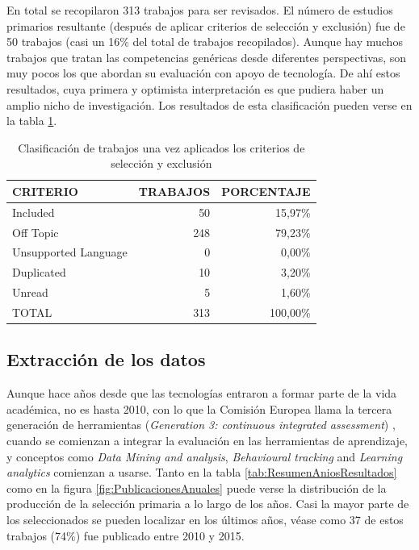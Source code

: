 En total se recopilaron 313 trabajos para ser revisados. El número de estudios primarios resultante (después de aplicar criterios de selección y exclusión) fue de 50 trabajos (casi un 16\% del total de trabajos recopilados). Aunque hay muchos trabajos que tratan las competencias genéricas desde diferentes perspectivas, son muy pocos los que abordan su evaluación con apoyo de tecnología. De ahí estos resultados, cuya primera y optimista interpretación es que pudiera haber un amplio nicho de investigación. Los resultados de esta clasificación pueden verse en la tabla \ref{tab:ResumenSelecccionResultados}.

\begin{table}
  \begin{center}
  \begin{tabular}{| m{4cm} | r | r |}
    \hline
    CRITERIO & TRABAJOS & PORCENTAJE\\
    \hline
    \hline 
    Included & 50 & 15,97\% \\
    \hline
    Off Topic & 248 & 79,23\% \\
    \hline
    Unsupported Language & 0 & 0,00\% \\
    \hline
    Duplicated & 10 & 3,20\% \\
    \hline
    Unread & 5 & 1,60\% \\
    \hline
    TOTAL & 313 & 100,00\% \\
    \hline
  \end{tabular}
\end{center}
\caption{Clasificación de trabajos una vez aplicados los criterios de selección y exclusión}
\label{tab:ResumenSelecccionResultados}
\end{table} 

\subsection{Extracción de los datos}

Aunque hace años desde que las tecnologías entraron a formar parte de la vida académica, no es hasta 2010, con lo que la Comisión Europea llama la tercera generación de herramientas (\emph{Generation 3: continuous integrated assessment}) \cite{Redecker:2013}, cuando se comienzan a integrar la evaluación en las herramientas de aprendizaje, y conceptos como \emph{Data Mining and analysis}, \emph{Behavioural tracking} and \emph{Learning analytics} comienzan a usarse. Tanto en la tabla \ref{tab:ResumenAniosResultados} como en la figura \ref{fig:PublicacionesAnuales} puede verse la distribución de la producción de la selección primaria a lo largo de los años. Casi la mayor parte de los seleccionados se pueden localizar en los últimos años, véase como 37 de estos trabajos (74\%) fue publicado entre 2010 y 2015.

